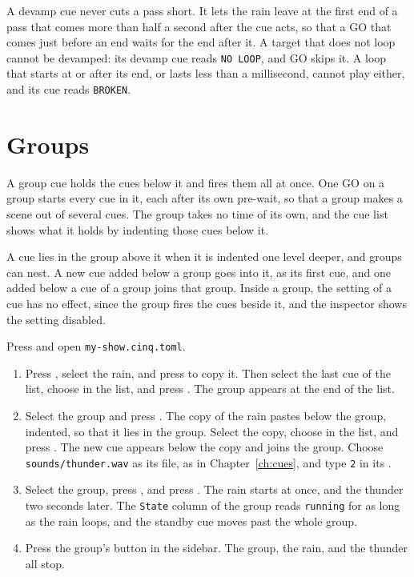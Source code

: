 A devamp cue never cuts a pass short.  It lets the rain leave at the first
end of a pass that comes more than half a second after the cue acts, so that a
GO that comes just before an end waits for the end after it.  A target that
does not loop cannot be devamped: its devamp cue reads \texttt{NO LOOP}, and GO
skips it.  A loop that starts at or after its end, or lasts less than a
millisecond, cannot play either, and its cue reads \texttt{BROKEN}\@.

\section{Groups}

A group cue holds the cues below it and fires them all at once.  One GO on a
group starts every cue in it, each after its own pre-wait, so that a group
makes a scene out of several cues.  The group takes no time of its own, and
the cue list shows what it holds by indenting those cues below it.

A cue lies in the group above it when it is indented one level deeper, and
groups can nest.  A new cue added below a group goes into it, as its first
cue, and one added below a cue of a group joins that group.  Inside a group,
the  setting of a cue has no effect, since the group fires the cues
beside it, and the inspector shows the setting disabled.

Press  and open \texttt{my-show.cinq.toml}.

\begin{enumerate}
\item Press , select the rain, and press  to copy it.  Then
  select the last cue of the list, choose  in the  list,
  and press \@.  The group appears at the end of the list.
\item Select the group and press .  The copy of the rain pastes below
  the group, indented, so that it lies in the group.  Select the copy, choose
   in the  list, and press \@.  The new cue
  appears below the copy and joins the group.  Choose
  \texttt{sounds/thunder.wav} as its file, as in Chapter~\ref{ch:cues}, and
  type \texttt{2} in its .
\item Select the group, press , and press \@.  The
  rain starts at once, and the thunder two seconds later.  The
  \texttt{State} column of the group reads \texttt{running} for as long as the
  rain loops, and the standby cue moves past the whole group.
\item Press the group's  button in the sidebar.  The group, the rain,
  and the thunder all stop.
\end{enumerate}

